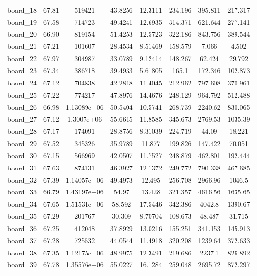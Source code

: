 \begin{table*}[!htbp]
\begin{center}
{\begin{tabular}{|c|c|cccc|cc|}
board\_18 & 67.81 & 519421 & 43.8256 & 12.3111 & 234.196 & 395.811 & 217.317 \\
board\_19 & 67.58 & 714723 & 49.4241 & 12.6935 & 314.371 & 621.644 & 277.141 \\
board\_20 & 66.90 & 819154 & 51.4253 & 12.5723 & 322.186 & 843.756 & 389.544 \\
board\_21 & 67.21 & 101607 & 28.4534 & 8.51469 & 158.579 & 7.066 & 4.502 \\
board\_22 & 67.97 & 304987 & 33.0789 & 9.12414 & 148.267 & 62.424 & 29.792 \\
board\_23 & 67.34 & 386718 & 39.4933 & 5.61805 & 165.1 & 172.346 & 102.873 \\
board\_24 & 67.12 & 704838 & 42.2818 & 11.4045 & 212.962 & 797.608 & 370.961 \\
board\_25 & 67.22 & 774217 & 47.8976 & 14.4676 & 248.129 & 964.792 & 512.488 \\
board\_26 & 66.98 & 1.13089e+06 & 50.5404 & 10.5741 & 268.739 & 2240.62 & 830.065 \\
board\_27 & 67.12 & 1.3007e+06 & 55.6615 & 11.8585 & 345.673 & 2769.53 & 1035.39 \\
board\_28 & 67.17 & 174091 & 28.8756 & 8.31039 & 224.719 & 44.09 & 18.221 \\
board\_29 & 67.52 & 345326 & 35.9789 & 11.877 & 199.826 & 147.422 & 70.051 \\
board\_30 & 67.15 & 566969 & 42.0507 & 11.7527 & 248.879 & 462.801 & 192.444 \\
board\_31 & 67.63 & 874131 & 46.3927 & 12.1372 & 249.772 & 790.338 & 467.685 \\
board\_32 & 67.39 & 1.14057e+06 & 49.4973 & 12.495 & 256.708 & 2966.96 & 1046.5 \\
board\_33 & 66.79 & 1.43197e+06 & 54.97 & 13.428 & 321.357 & 4616.56 & 1635.65 \\
board\_34 & 67.65 & 1.51531e+06 & 58.592 & 17.5446 & 342.386 & 4042.8 & 1390.67 \\
board\_35 & 67.29 & 201767 & 30.309 & 8.70704 & 108.673 & 48.487 & 31.715 \\
board\_36 & 67.25 & 412048 & 37.8929 & 13.0216 & 155.251 & 341.153 & 145.913 \\
board\_37 & 67.28 & 725532 & 44.0544 & 11.4918 & 320.208 & 1239.64 & 372.633 \\
board\_38 & 67.35 & 1.12175e+06 & 48.9975 & 12.3491 & 219.686 & 2237.1 & 826.892 \\
board\_39 & 67.78 & 1.35576e+06 & 55.0227 & 16.1284 & 259.048 & 2695.72 & 872.297 \\

\end{tabular}}
\end{center}
\end{table*}
